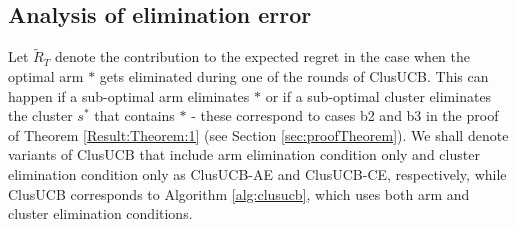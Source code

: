% 
%
%
%
%
%

\subsection*{Analysis of elimination error}
Let $\tilde R_T$ denote the contribution  to the expected regret in the case when the optimal arm $*$ gets eliminated during one of the rounds of ClusUCB. This can happen if a sub-optimal arm eliminates $*$ or if a sub-optimal cluster eliminates the cluster $s^*$ that contains $*$ - these correspond to cases b2 and b3 in the proof of Theorem \ref{Result:Theorem:1} (see Section \ref{sec:proofTheorem}). 
We shall denote variants of ClusUCB that include arm elimination condition only and cluster elimination condition only as ClusUCB-AE and ClusUCB-CE, respectively, while ClusUCB corresponds to Algorithm \ref{alg:clusucb}, which uses both arm and cluster elimination conditions.

